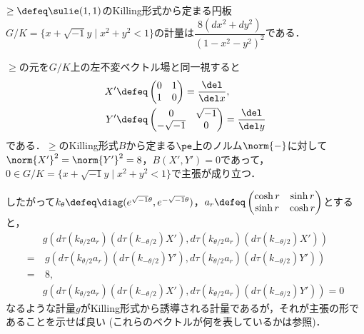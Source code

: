
\begin{lem}\label{lem:riem-metric-su11}
  $\ge\defeq \sulie(1,1)$のKilling形式から定まる{\Poincare}円板${G/K =\{x+\sqrt{-1}y\mid  x^2 + y^2 < 1 \} }$の計量は$ \dfrac{8(dx^2 + dy^2)}{(1 - x^2 - y^2)^2} $である．
\end{lem}

\begin{npfwn}
  
  $\ge$の元を$G/K$上の左不変ベクトル場と同一視すると
  \begin{align*}
    X' &\defeq 
         \begin{pmatrix}
           0 & 1 \\ 1 & 0
         \end{pmatrix} = \dfrac{\del}{\del x},\\
    Y' &\defeq 
         \begin{pmatrix}
           0 & \sqrt{-1} \\ -\sqrt{-1} & 0
         \end{pmatrix} = \dfrac{\del}{\del y}
  \end{align*}
  である．$\ge$のKilling形式$B$から定まる$\pe$上のノルム$\norm{-} $に対して$\norm{X'}^2 = \norm{Y'}^2 = 8 $，$B(X', Y' ) = 0$であって，$0\in G/K =\{x+\sqrt{-1}y\mid x^2 + y^2 < 1 \}  $で主張が成り立つ．

  したがって$k_{\theta} \defeq \diag(e^{\sqrt{-1}\theta},e^{-\sqrt{-1}\theta}) $，$a_r\defeq
  \begin{pmatrix}
    \cosh r & \sinh r \\  \sinh r & \cosh r
  \end{pmatrix}
  $とすると，
  \begin{align*}
    &g(d\tau(k_{\theta/2}a_r)(d\tau(k_{-\theta/2})X'), d\tau(k_{\theta/2}a_r)(d\tau(k_{-\theta/2})X')) \\
    =&\ g (d\tau(k_{\theta/2}a_r)(d\tau(k_{-\theta/2})Y'), d\tau(k_{\theta/2}a_r)(d\tau(k_{-\theta/2})Y')) \\
    =&\ 8, \\
    &g(d\tau(k_{\theta/2}a_r)(d\tau(k_{-\theta/2})X'), d\tau(k_{\theta/2}a_r)(d\tau(k_{-\theta/2})Y'))  = 0
  \end{align*}
  なるような計量$g $がKilling形式から誘導される計量であるが，それが主張の形であることを示せば良い (これらのベクトルが何を表しているかは参照)．


\end{npfwn}
